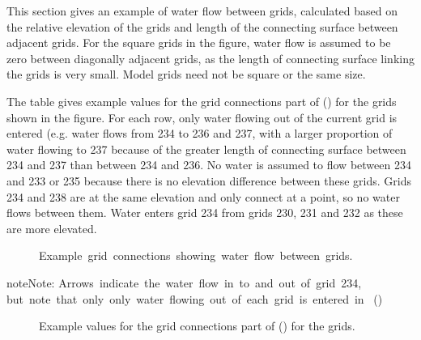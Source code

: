 \documentclass[letterpaper,10pt,english]{sphinxmanual}
\begin{document}
This section gives an example of water flow between grids, calculated
based on the relative elevation of the grids and length of the
connecting surface between adjacent grids. For the square grids in the
figure, water flow is assumed to be zero between diagonally adjacent
grids, as the length of connecting surface linking the grids is very
small. Model grids need not be square or the same size.

The table gives example values for the grid connections part of
{\hyperref[\detokenize{input_files/SUEWS_SiteInfo/SUEWS_SiteSelect:suews-siteselect-txt}]{}} () for the grids shown in
the figure. For each row, only water flowing out of the current grid is
entered (e.g. water flows from 234 to 236 and 237, with a larger
proportion of water flowing to 237 because of the greater length of
connecting surface between 234 and 237 than between 234 and 236. No
water is assumed to flow between 234 and 233 or 235 because there is no
elevation difference between these grids. Grids 234 and 238 are at the
same elevation and only connect at a point, so no water flows between
them. Water enters grid 234 from grids 230, 231 and 232 as these are
more elevated.

\begin{figure}[htbp]
\centering
\capstart

\noindent{}
\caption{Example grid connections showing water flow between grids.}\label{\detokenize{input_files/SUEWS_SiteInfo/SUEWS_SiteSelect:id2}}\end{figure}

\begin{sphinxadmonition}{note}{Note:}
Arrows indicate the water flow in to and out of grid 234,
but note that only only water flowing out of each grid is entered in {\hyperref[\detokenize{input_files/SUEWS_SiteInfo/SUEWS_SiteSelect:suews-siteselect-txt}]{}} ()
\end{sphinxadmonition}

\begin{figure}[htbp]
\centering
\capstart

\noindent{}
\caption{Example values for the grid connections part of {\hyperref[\detokenize{input_files/SUEWS_SiteInfo/SUEWS_SiteSelect:suews-siteselect-txt}]{}} () for the grids.}\label{\detokenize{input_files/SUEWS_SiteInfo/SUEWS_SiteSelect:id3}}\end{figure}
\end{document}
